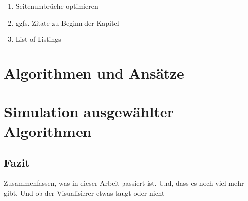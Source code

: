 
\listfiles


\listoftodos

\begin{enumerate}
	\item Seitenumbrüche optimieren
	\item ggfs. Zitate zu Beginn der Kapitel
	\item List of Listings
\end{enumerate}



\cleardoublepage

\setcounter{page}{1}
\pagestyle{maincontentstyle}


\part{Algorithmen und Ansätze}






\part{Simulation ausgewählter Algorithmen}


\cleardoublepage

\chapter{Fazit}
Zusammenfassen, was in dieser Arbeit passiert ist.
Und, dass es noch viel mehr gibt.
Und ob der Visualisierer etwas taugt oder nicht.




